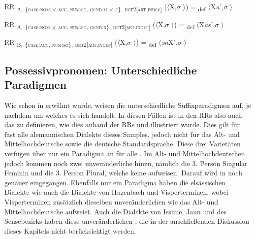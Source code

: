 \ea%
\label{ex:key:148}
 RR \textsubscript{A,} \textsubscript{\{\textsc{case:nom}} \textsubscript{\tiny $\veebar$}\textsubscript{ \textsc{acc}}\textsubscript{, \textsc{num:sg}, \textsc{gend:m}} \textsubscript{\tiny $\veebar$}\textsubscript{ \textsc{f}\},} \textsubscript{\textsc{det2[art.indef]}} ($\langle$X,$\sigma$ $\rangle$) = \textsubscript{def} $\langle$X\textit{a}ˊ,$\sigma$ $\rangle$
\z

\ea%
\label{ex:key:149}
 RR \textsubscript{A,} \textsubscript{\{\textsc{case:nom}} \textsubscript{\tiny $\veebar$}\textsubscript{ \textsc{acc}}\textsubscript{, \textsc{num:sg}, \textsc{gend:n}\},} \textsubscript{\textsc{det2[art.indef]}} ($\langle$X,$\sigma$ $\rangle$) = \textsubscript{def} $\langle$X\textit{as}ˊ,$\sigma$ $\rangle$
\z

\ea%
\label{ex:key:150}
 RR \textsubscript{B,} \textsubscript{\{\textsc{case:}}\textsubscript{\textsc{acc}}\textsubscript{, \textsc{num:sg}\},} \textsubscript{\textsc{det2[art.indef]}} ($\langle$X,$\sigma$ $\rangle$) = \textsubscript{def} $\langle$\textit{ən}Xˊ,$\sigma$ $\rangle$
\z

\subsection{Possessivpronomen: Unterschiedliche Paradigmen}\label{5.6.6}

Wie schon in  erwähnt wurde, weisen die  unterschiedliche Suffixparadigmen auf, je nachdem um welches  es sich handelt. In diesen Fällen ist in den RRs also auch das  zu definieren, wie dies anhand der RRs  und  illustriert wurde. Dies gilt für fast alle alemannischen Dialekte dieses Samples, jedoch nicht für das Alt- und Mittelhochdeutsche sowie die deutsche Standardsprache. Diese drei Varietäten verfügen über nur ein Paradigma an  für alle . Im Alt- und Mittelhochdeutschen jedoch kommen noch zwei unveränderliche  hinzu, nämlich die 3. Person Singular Feminin und die 3. Person Plural, welche keine  aufweisen. Darauf wird in  noch genauer eingegangen. Ebenfalls nur ein Paradigma haben die elsässischen Dialekte wie auch die Dialekte von Huzenbach und Visperterminen, wobei Visperterminen zusätzlich dieselben unveränderlichen  wie das Alt- und Mittelhochdeutsche aufweist. Auch die Dialekte von Issime, Jaun und des Sensebezirks haben diese unveränderlichen , die in der anschließenden Diskussion dieses Kapitels nicht berücksichtigt werden.

